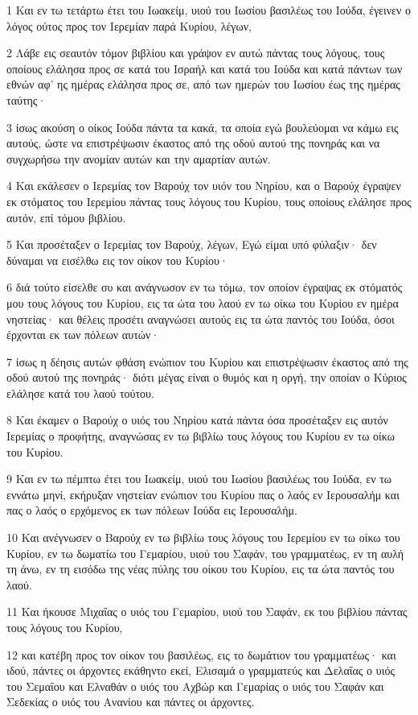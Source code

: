 \par 1 Και εν τω τετάρτω έτει του Ιωακείμ, υιού του Ιωσίου βασιλέως του Ιούδα, έγεινεν ο λόγος ούτος προς τον Ιερεμίαν παρά Κυρίου, λέγων,
\par 2 Λάβε εις σεαυτόν τόμον βιβλίου και γράψον εν αυτώ πάντας τους λόγους, τους οποίους ελάλησα προς σε κατά του Ισραήλ και κατά του Ιούδα και κατά πάντων των εθνών αφ' ης ημέρας ελάλησα προς σε, από των ημερών του Ιωσίου έως της ημέρας ταύτης·
\par 3 ίσως ακούση ο οίκος Ιούδα πάντα τα κακά, τα οποία εγώ βουλεύομαι να κάμω εις αυτούς, ώστε να επιστρέψωσιν έκαστος από της οδού αυτού της πονηράς και να συγχωρήσω την ανομίαν αυτών και την αμαρτίαν αυτών.
\par 4 Και εκάλεσεν ο Ιερεμίας τον Βαρούχ τον υιόν του Νηρίου, και ο Βαρούχ έγραψεν εκ στόματος του Ιερεμίου πάντας τους λόγους του Κυρίου, τους οποίους ελάλησε προς αυτόν, επί τόμου βιβλίου.
\par 5 Και προσέταξεν ο Ιερεμίας τον Βαρούχ, λέγων, Εγώ είμαι υπό φύλαξιν· δεν δύναμαι να εισέλθω εις τον οίκον του Κυρίου·
\par 6 διά τούτο είσελθε συ και ανάγνωσον εν τω τόμω, τον οποίον έγραψας εκ στόματός μου τους λόγους του Κυρίου, εις τα ώτα του λαού εν τω οίκω του Κυρίου εν ημέρα νηστείας· και θέλεις προσέτι αναγνώσει αυτούς εις τα ώτα παντός του Ιούδα, όσοι έρχονται εκ των πόλεων αυτών·
\par 7 ίσως η δέησις αυτών φθάση ενώπιον του Κυρίου και επιστρέψωσιν έκαστος από της οδού αυτού της πονηράς· διότι μέγας είναι ο θυμός και η οργή, την οποίαν ο Κύριος ελάλησε κατά του λαού τούτου.
\par 8 Και έκαμεν ο Βαρούχ ο υιός του Νηρίου κατά πάντα όσα προσέταξεν εις αυτόν Ιερεμίας ο προφήτης, αναγνώσας εν τω βιβλίω τους λόγους του Κυρίου εν τω οίκω του Κυρίου.
\par 9 Και εν τω πέμπτω έτει του Ιωακείμ, υιού του Ιωσίου βασιλέως του Ιούδα, εν τω εννάτω μηνί, εκήρυξαν νηστείαν ενώπιον του Κυρίου πας ο λαός εν Ιερουσαλήμ και πας ο λαός ο ερχόμενος εκ των πόλεων Ιούδα εις Ιερουσαλήμ.
\par 10 Και ανέγνωσεν ο Βαρούχ εν τω βιβλίω τους λόγους του Ιερεμίου εν τω οίκω του Κυρίου, εν τω δωματίω του Γεμαρίου, υιού του Σαφάν, του γραμματέως, εν τη αυλή τη άνω, εν τη εισόδω της νέας πύλης του οίκου του Κυρίου, εις τα ώτα παντός του λαού.
\par 11 Και ήκουσε Μιχαΐας ο υιός του Γεμαρίου, υιού του Σαφάν, εκ του βιβλίου πάντας τους λόγους του Κυρίου,
\par 12 και κατέβη προς τον οίκον του βασιλέως, εις το δωμάτιον του γραμματέως· και ιδού, πάντες οι άρχοντες εκάθηντο εκεί, Ελισαμά ο γραμματεύς και Δελαΐας ο υιός του Σεμαΐου και Ελναθάν ο υιός του Αχβώρ και Γεμαρίας ο υιός του Σαφάν και Σεδεκίας ο υιός του Ανανίου και πάντες οι άρχοντες.
